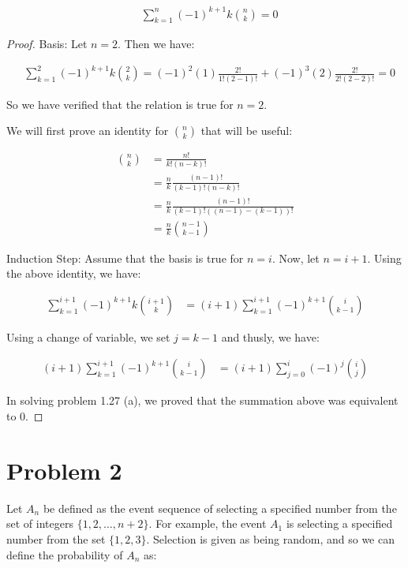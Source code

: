 \documentclass[11pt]{article}
\begin{document}
\begin{enumerate}[(a)]
\begin{align*}
  & \sum_{k=1}^n (-1)^{k+1} k {n \choose k} = 0
\end{align*}

\begin{proof}
Basis: Let $n=2$.  Then we have:

\begin{align*}
  & \sum_{k=1}^2 (-1)^{k+1} k {2 \choose k} = (-1)^2 (1) \frac{2!}{1!(2-1)!} + (-1)^3 (2) \frac{2!}{2!(2-2)!} = 0
\end{align*}

So we have verified that the relation is true for $n=2$.

We will first prove an identity for ${n \choose k}$ that will be useful:

\begin{align*}
{n \choose k} &= \frac{n!}{k!(n-k)!} \\
&= \frac{n}{k} \frac{(n-1)!}{(k-1)!(n-k)!} \\
&= \frac{n}{k} \frac{(n-1)!}{(k-1)!((n-1) - (k-1))!} \\
&= \frac{n}{k} {n-1 \choose k-1}
\end{align*}

Induction Step: Assume that the basis is true for $n=i$.  Now, let $n=i+1$.  Using the above identity, we have:

\begin{align*}
  \sum_{k=1}^{i+1} (-1)^{k+1} k {i+1 \choose k} &= (i+1) \sum_{k=1}^{i+1} (-1)^{k+1} {i \choose k-1}
\end{align*}

Using a change of variable, we set $j=k-1$ and thusly, we have:

\begin{align*}
  (i+1) \sum_{k=1}^{i+1} (-1)^{k+1} {i \choose k-1} &= (i+1) \sum_{j=0}^{i} (-1)^j {i \choose j}
\end{align*}

In solving problem 1.27 (a), we proved that the summation above was equivalent to 0.

\end{proof}

\end{enumerate}

\section*{Problem 2}

Let $A_n$ be defined as the event sequence of selecting a specified number from the set of integers $\{1,2, \dots, n+2\}$.  For example, the event $A_1$ is selecting a specified number from the set $\{1,2,3\}$.  Selection is given as being random, and so we can define the probability of $A_n$ as:
\end{document}
